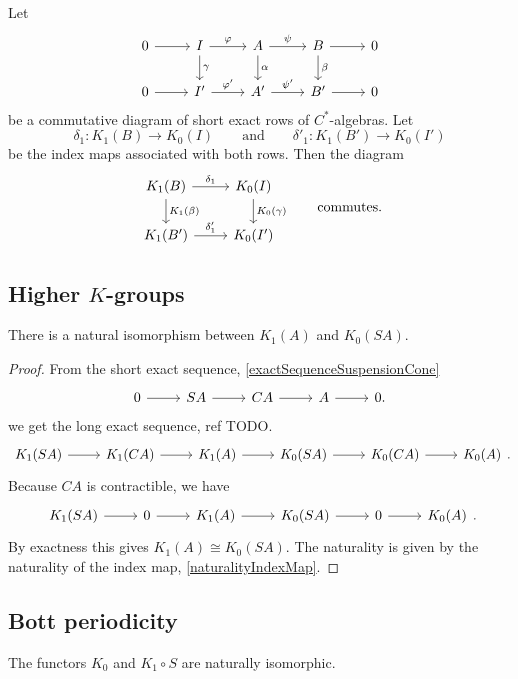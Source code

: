 \begin{proposition} \label{naturalityIndexMap}
Let
\[ \begin{tikzcd}
0 \rar & I \dar{\gamma} \rar{\varphi} & A \dar{\alpha} \rar{\psi} & B \dar{\beta} \rar & 0 \\
0 \rar & I' \rar{\varphi'} & A' \rar{\psi'} & B' \rar & 0
\end{tikzcd} \]
be a commutative diagram of short exact rows of $C^*$-algebras. Let
\[ \delta_1: K_1(B) \to K_0(I) \qquad \text{and} \qquad \delta'_1: K_1(B') \to K_0(I') \]
be the index maps associated with both rows. Then the diagram
\[ \begin{tikzcd}
K_1(B) \rar{\delta_1} \dar{K_1(\beta)} & K_0(I) \dar{K_0(\gamma)} \\
K_1(B') \rar{\delta_1'} & K_0(I')
\end{tikzcd} \qquad \text{commutes.} \]
\end{proposition}

\subsection{Higher $K$-groups}
\begin{proposition}
There is a natural isomorphism between $K_1(A)$ and $K_0(SA)$.
\end{proposition}
\begin{proof}
From the short exact sequence, \ref{exactSequenceSuspensionCone}
\[ \begin{tikzcd}
 0 \rar & SA \rar & CA \rar & A \rar & 0.
\end{tikzcd} \]
we get the long exact sequence, ref TODO.
\[ \begin{tikzcd}
K_1(SA) \rar & K_1(CA) \rar & K_1(A) \rar & K_0(SA) \rar & K_0(CA) \rar & K_0(A)
\end{tikzcd}. \]
Because $CA$ is contractible, we have
\[ \begin{tikzcd}
K_1(SA) \rar & 0 \rar & K_1(A) \rar & K_0(SA) \rar & 0 \rar & K_0(A)
\end{tikzcd}. \]
By exactness this gives $K_1(A) \cong K_0(SA)$. The naturality is given by the naturality of the index map, \ref{naturalityIndexMap}.
\end{proof}

\subsection{Bott periodicity}
\begin{theorem}
The functors $K_0$ and $K_1\circ S$ are naturally isomorphic.
\end{theorem}
